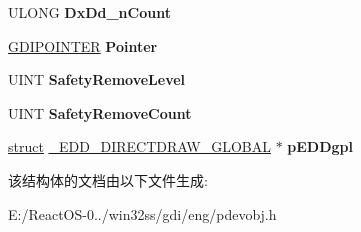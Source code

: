 \begin{DoxyCompactItemize}
\begin{tabbing}
\end{tabbing}\item 
\mbox{\label{struct___p_d_e_v_o_b_j_a20896dd961a85e5a101e9ca3b9b4b0cf}} 
U\+L\+O\+NG {\bfseries Dx\+Dd\+\_\+n\+Count}
\item 
\mbox{\label{struct___p_d_e_v_o_b_j_a1bd96b51284250252216315b81df788e}} 
\hyperlink{struct___g_d_i_p_o_i_n_t_e_r}{G\+D\+I\+P\+O\+I\+N\+T\+ER} {\bfseries Pointer}
\item 
\mbox{\label{struct___p_d_e_v_o_b_j_a44f19f7a0770f5979253faf3a3ba6ae1}} 
U\+I\+NT {\bfseries Safety\+Remove\+Level}
\item 
\mbox{\label{struct___p_d_e_v_o_b_j_a4930cfa9b4dbaca78b7fea0512b64377}} 
U\+I\+NT {\bfseries Safety\+Remove\+Count}
\item 
\mbox{\label{struct___p_d_e_v_o_b_j_a42f5e4d4222c48c43a71ce50f2a60b9c}} 
\hyperlink{interfacestruct}{struct} \hyperlink{struct___e_d_d___d_i_r_e_c_t_d_r_a_w___g_l_o_b_a_l}{\+\_\+\+E\+D\+D\+\_\+\+D\+I\+R\+E\+C\+T\+D\+R\+A\+W\+\_\+\+G\+L\+O\+B\+AL} $\ast$ {\bfseries p\+E\+D\+Dgpl}
\end{DoxyCompactItemize}


该结构体的文档由以下文件生成\+:\begin{DoxyCompactItemize}
\item 
E\+:/\+React\+O\+S-\/0../win32ss/gdi/eng/pdevobj.\+h\end{DoxyCompactItemize}
